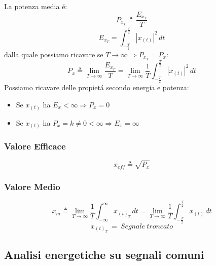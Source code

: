             La potenza media é:
            \[
                P_{x_{T}} \triangleq \frac{E_{x_{T}}}{T}    
            \]
            \[
                E_{x_{T}} = \int_{-\frac{T}{2}}^{\frac{T}{2}}  |x_{(t)}|^2 \,dt  
            \]
            dalla quale possiamo ricavare se $T \rightarrow \infty \Rightarrow P_{x_{T}} = P_{x}$:
            \[
                P_{x} \triangleq \lim_{T\rightarrow\infty} \frac{E_{x_{T}}}{T} =\lim_{T\rightarrow\infty} \frac{1}{T} \int_{-\frac{T}{2}}^{\frac{T}{2}}  |x_{(t)}|^2 \,dt    
            \]  
            Possiamo ricavare delle propietá secondo energia e potenza:
            \begin{itemize}
                \item Se $x_{(t)}$ ha $E_x < \infty \Rightarrow P_x = 0$
                \item Se $x_{(t)}$ ha $P_x = k \neq 0 < \infty \Rightarrow E_x = \infty$
            \end{itemize}
        \subsubsection{Valore Efficace}\label{Valore Efficace}
                \[    
                    x_{eff} \triangleq \sqrt{P_{x}}
                \]
        
        \subsubsection{Valore Medio}\label{Valore medio}

                    \[
                        x_{m} \triangleq \lim_{T\rightarrow\infty} \frac{1}{T} \int_{-\infty}^{\infty}  x_{(t)_T} \,dt = \lim_{T\rightarrow\infty} \frac{1}{T} \int_{-\frac{T}{2}}^{\frac{T}{2}}  x_{(t)} \,dt 
                    \]
                    \[
                        x_{(t)_T}\ =\ Segnale\ troncato
                    \]
                    
    \subsection{Analisi energetiche su segnali comuni}
